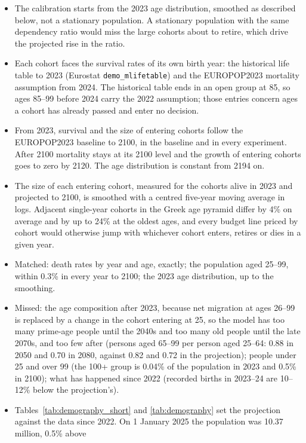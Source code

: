 \documentclass[11pt,a4paper]{article}
\begin{document}
\noindent\footnotesize
\begin{itemize}
\item The calibration starts from the 2023 age distribution, smoothed as
  described below, not a stationary population. A stationary population with the same dependency
  ratio would miss the large cohorts about to retire, which drive the
  projected rise in the ratio.
\item Each cohort faces the survival rates of its own birth year: the
  historical life table to 2023 (Eurostat \texttt{demo\_mlifetable}) and the
  EUROPOP2023 mortality assumption from 2024. The historical table ends in an
  open group at 85, so ages 85--99 before 2024 carry the 2022 assumption;
  those entries concern ages a cohort has already passed and enter no
  decision.
\item From 2023, survival and the size of entering cohorts follow the
  EUROPOP2023 baseline to 2100, in the baseline and in every experiment.
  After 2100 mortality stays at its 2100 level and the growth of entering
  cohorts goes to zero by 2120. The age distribution is constant from 2194 on.
\item The size of each entering cohort, measured for the cohorts alive in
  2023 and projected to 2100, is smoothed with a centred five-year moving
  average in logs. Adjacent single-year cohorts in the Greek age pyramid
  differ by 4\% on average and by up to 24\% at the oldest ages, and every
  budget line priced by cohort would otherwise jump with whichever cohort
  enters, retires or dies in a given year.
\item Matched: death rates by year and age, exactly; the population aged
  25--99, within 0.3\% in every year to 2100; the 2023 age distribution, up
  to the smoothing.
\item Missed: the age composition after 2023, because net migration at ages
  26--99 is replaced by a change in the cohort entering at 25, so the model
  has too many prime-age people until the 2040s and too many old people
  until the late 2070s, and too few after (persons aged 65--99 per person
  aged 25--64: 0.88 in 2050 and 0.70 in 2080, against 0.82 and 0.72 in the
  projection); people under 25 and over 99 (the 100+ group is 0.04\% of the
  population in 2023 and 0.5\% in 2100); what has happened since 2022
  (recorded births in 2023--24 are 10--12\% below the projection's).
\item Tables~\ref{tab:demography_short} and \ref{tab:demography} set the
  projection against the data since 2022. On 1 January 2025 the population was 10.37 million, 0.5\% above

\end{itemize}
\end{document}
